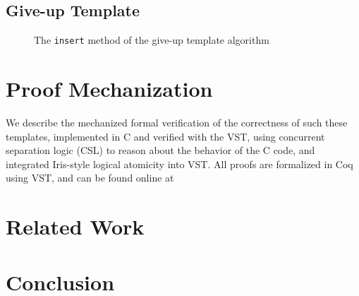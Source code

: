 \documentclass[a4paper,UKenglish,cleveref, autoref, thm-restate]{lipics-v2021}
\begin{document}
\subsection{Give-up Template}

\begin{figure}[ht]
	 
	\caption{The \lstinline{insert} method of the give-up template algorithm}
	\label{insert_giveup}
\end{figure}

\section{Proof Mechanization}
We describe the mechanized formal verification of the correctness of such these templates, implemented in C and verified with the VST, using concurrent separation logic (CSL) to reason about the behavior of the C code, and integrated Iris-style logical atomicity into VST. All proofs are formalized in Coq using VST, and can be found online at 

\href{https://github.com/PrincetonUniversity/DeepSpecDB/tree/master/concurrency/templates}{\color{blue}{https://github.com/PrincetonUniversity/DeepSpecDB/tree/master/concurrency/templates}}




\section{Related Work}

\section{Conclusion}







\end{document}
